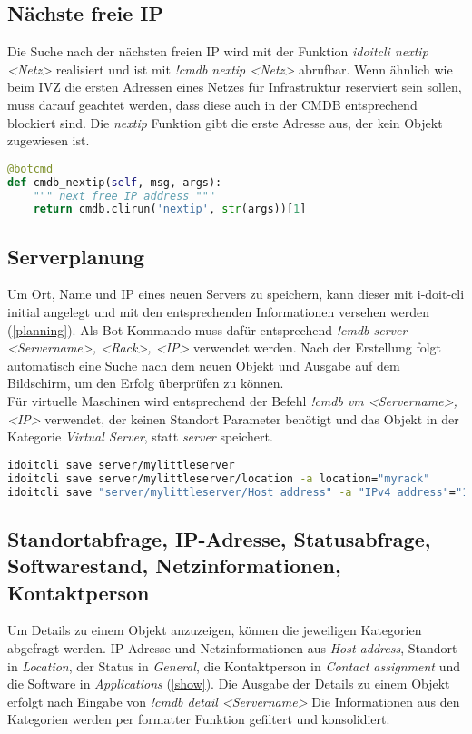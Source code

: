 \subsection{Nächste freie IP}
Die Suche nach der nächsten freien IP wird mit der Funktion \textit{idoitcli nextip <Netz>} realisiert und ist mit \textit{!cmdb nextip <Netz>} abrufbar. Wenn ähnlich wie beim IVZ die ersten Adressen eines Netzes für Infrastruktur reserviert sein sollen, muss darauf geachtet werden, dass diese auch in der \acs{CMDB} 
entsprechend blockiert sind. Die \textit{nextip} Funktion gibt die erste Adresse aus, der kein Objekt zugewiesen ist.

\begin{lstlisting}[language=python, label=nextip, caption=Nächste freie IP]
@botcmd
def cmdb_nextip(self, msg, args):
    """ next free IP address """
    return cmdb.clirun('nextip', str(args))[1]
\end{lstlisting}


\subsection{Serverplanung}
Um Ort, Name und IP eines neuen Servers zu speichern, kann dieser mit i-doit-cli initial angelegt und mit den entsprechenden Informationen versehen werden (\autoref{planning}). Als Bot Kommando muss dafür entsprechend \textit{!cmdb server <Servername>, <Rack>, <IP>} verwendet werden. Nach der Erstellung folgt automatisch eine Suche nach dem neuen Objekt und Ausgabe auf dem Bildschirm, um den Erfolg überprüfen zu können.\\
Für virtuelle Maschinen wird entsprechend der Befehl \textit{!cmdb vm <Servername>, <IP>} verwendet, der keinen Standort Parameter benötigt und das Objekt in der Kategorie \textit{Virtual Server}, statt \textit{server} speichert.

\begin{lstlisting}[language=bash, label=planning, caption=Serverplanung mit i-doit-cli]
idoitcli save server/mylittleserver
idoitcli save server/mylittleserver/location -a location="myrack"
idoitcli save "server/mylittleserver/Host address" -a "IPv4 address"="192.168.0.2"
\end{lstlisting}

\subsection{Standortabfrage, IP-Adresse, Statusabfrage, Softwarestand, Netzinformationen, Kontaktperson}
Um Details zu einem Objekt anzuzeigen, können die jeweiligen Kategorien abgefragt werden. IP-Adresse und Netzinformationen aus \textit{Host address}, Standort in \textit{Location}, der Status in \textit{General}, die Kontaktperson in \textit{Contact assignment} und die Software in \textit{Applications} (\autoref{show}). Die Ausgabe der Details zu einem Objekt erfolgt nach Eingabe von \textit{!cmdb detail <Servername>} Die Informationen aus den Kategorien werden per formatter Funktion gefiltert und konsolidiert.

